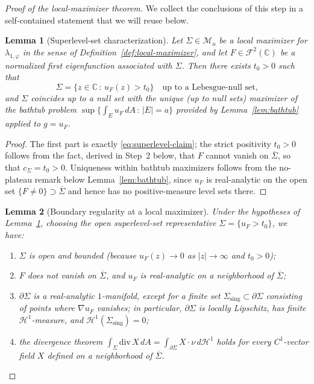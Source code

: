 \documentclass[a4paper,11pt,reqno]{amsart}
\numberwithin{equation}{section}
\theoremstyle{plain} %
\newtheorem{lemma}{Lemma}[section]
\theoremstyle{definition} %
\theoremstyle{remark}
\newcommand{\C}{\mathbb{C}}
\begin{document}
\begin{proof}[Proof of the local-maximizer theorem]
We collect the conclusions of this step in a self-contained statement that we
will reuse below.

\begin{lemma}[Superlevel-set characterization]\label{lem:bathtub-superlevel-from-localmax}
Let \(\Sigma\in\mathcal M_a\) be a local maximizer for \(\lambda_{1,\varphi}\)
in the sense of Definition~\ref{def:local-maximizer}, and let \(F\in
\mathcal F^2(\C)\) be a normalized first eigenfunction associated with
\(\Sigma\). Then there exists \(t_0>0\) such that
\begin{equation}\label{eq:superlevel-strong}
\Sigma=\{z\in\C\,:\, u_F(z)>t_0\}\quad
\text{up to a Lebesgue-null set,}
\end{equation}
and \(\Sigma\) coincides up to a null set with the unique (up to null sets)
maximizer of the bathtub problem
\(\sup\{\int_E u_F\,dA\,:\,|E|=a\}\) provided by Lemma~\ref{lem:bathtub}
applied to \(g=u_F\).
\end{lemma}

\begin{proof}
The first part is exactly \eqref{eq:superlevel-claim}; the strict positivity
\(t_0>0\) follows from the fact, derived in Step~2 below, that \(F\) cannot
vanish on \(\overline\Sigma\), so that \(c_\Sigma=t_0>0\). Uniqueness within
bathtub maximizers follows from the no-plateau remark below
Lemma~\ref{lem:bathtub}, since \(u_F\) is real-analytic on the open set
\(\{F\ne 0\}\supset\overline\Sigma\) and hence has no positive-measure level
sets there.
\end{proof}

\begin{lemma}[Boundary regularity at a local maximizer]\label{lem:boundary-reg}
Under the hypotheses of Lemma~\ref{lem:bathtub-superlevel-from-localmax},
choosing the open superlevel-set representative
\(\Sigma=\{u_F>t_0\}\), we have:
\begin{enumerate}
\item[\textnormal{(i)}] \(\Sigma\) is open and bounded (because
\(u_F(z)\to 0\) as \(|z|\to\infty\) and \(t_0>0\));
\item[\textnormal{(ii)}] \(F\) does not vanish on \(\overline\Sigma\), and
\(u_F\) is real-analytic on a neighborhood of \(\overline\Sigma\);
\item[\textnormal{(iii)}] \(\partial\Sigma\) is a real-analytic
\(1\)-manifold, except for a finite set
\(\Sigma_{\mathrm{sing}}\subset \partial\Sigma\) consisting of points where
\(\nabla u_F\) vanishes; in particular, \(\partial\Sigma\) is locally
Lipschitz, has finite \(\mathcal H^1\)-measure, and
\(\mathcal H^1(\Sigma_{\mathrm{sing}})=0\);
\item[\textnormal{(iv)}] the divergence theorem
\(\int_\Sigma \mathrm{div}\,X\,dA=\int_{\partial\Sigma}X\cdot\nu\,
d\mathcal H^1\) holds for every \(C^1\)-vector field \(X\) defined on a
neighborhood of \(\overline\Sigma\).
\end{enumerate}
\end{lemma}


\end{proof}
\end{document}
